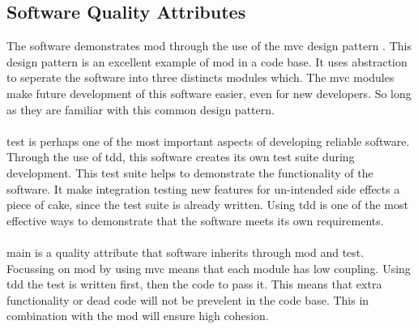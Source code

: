 \documentclass{article}
\newcommand{\comment}[1]{}
\begin{document}
\subsection{Software Quality Attributes}
\comment{
Specify any additional quality characteristics for the product that will be omportant to either the customer or the developer. Some to consider are adaptability, availability, correctness, flexibility, interoperability, maintaintability, portability, reliability, reusability, robustness, testability, and usability. Write these to be specific, quantative and verifiable where possible. At least, clarify the relative preferences for various attributes, such as ease of use over ease of learning.dd
	}
The software demonstrates \gls{mod} through the use of the \acrshort{mvc} design pattern \parencite{designpatterns97}. This design pattern is an excellent example of \gls{mod} in a code base. It uses abstraction to seperate the software into three distincts modules which. The \acrfull{mvc} modules make future development of this software easier, even for new developers. So long as they are familiar with this common design pattern.
\\ \\
\Gls{test} is perhaps one of the most important aspects of developing reliable software. Through the use of \acrshort{tdd}, this software creates its own test suite during development. This test suite helps to demonstrate the functionality of the software. It make integration testing new features for un-intended side effects a piece of cake, since the test suite is already written. Using \acrshort{tdd} is one of the most effective ways to demonstrate that the software meets its own requirements.
\\ \\
\Gls{main} is a quality attribute that software inherits through \gls{mod} and \gls{test}. Focussing on \gls{mod} by using \gls{mvc} means that each module has low coupling. Using \gls{tdd} the test is written first, then the code to pass it. This means that extra functionality or dead code will not be prevelent in the code base. This in combination with the \gls{mod} will ensure high cohesion.
\end{document}
